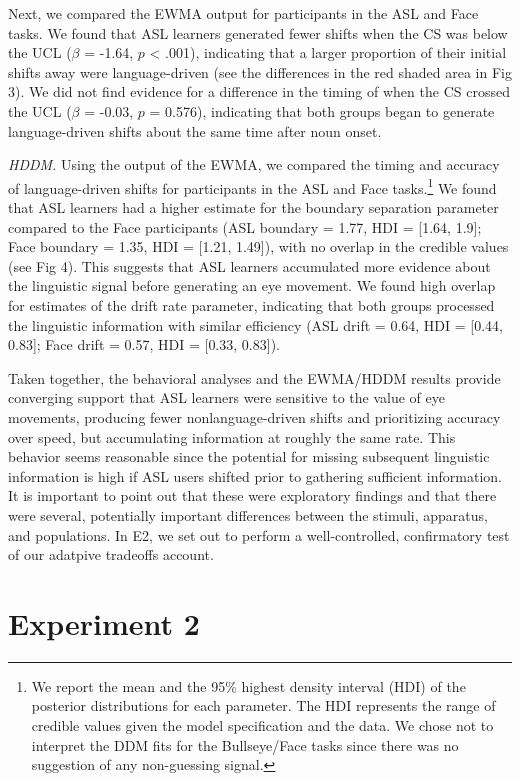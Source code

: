 \documentclass[10pt, letterpaper]{article}
\begin{document}
Next, we compared the EWMA output for participants in the ASL and Face
tasks. We found that ASL learners generated fewer shifts when the CS was
below the UCL (\(\beta\) = -1.64, \(p\) \textless{} .001), indicating
that a larger proportion of their initial shifts away were
language-driven (see the differences in the red shaded area in Fig 3).
We did not find evidence for a difference in the timing of when the CS
crossed the UCL (\(\beta\) = -0.03, \(p\) = 0.576), indicating that both
groups began to generate language-driven shifts about the same time
after noun onset.

\emph{HDDM.} Using the output of the EWMA, we compared the timing and
accuracy of language-driven shifts for participants in the ASL and Face
tasks.\footnote{We report the mean and the 95\% highest density interval
  (HDI) of the posterior distributions for each parameter. The HDI
  represents the range of credible values given the model specification
  and the data. We chose not to interpret the DDM fits for the
  Bullseye/Face tasks since there was no suggestion of any non-guessing
  signal.} We found that ASL learners had a higher estimate for the
boundary separation parameter compared to the Face participants (ASL
boundary = 1.77, HDI = {[}1.64, 1.9{]}; Face boundary = 1.35, HDI =
{[}1.21, 1.49{]}), with no overlap in the credible values (see Fig 4).
This suggests that ASL learners accumulated more evidence about the
linguistic signal before generating an eye movement. We found high
overlap for estimates of the drift rate parameter, indicating that both
groups processed the linguistic information with similar efficiency (ASL
drift = 0.64, HDI = {[}0.44, 0.83{]}; Face drift = 0.57, HDI = {[}0.33,
0.83{]}).

Taken together, the behavioral analyses and the EWMA/HDDM results
provide converging support that ASL learners were sensitive to the value
of eye movements, producing fewer nonlanguage-driven shifts and
prioritizing accuracy over speed, but accumulating information at
roughly the same rate. This behavior seems reasonable since the
potential for missing subsequent linguistic information is high if ASL
users shifted prior to gathering sufficient information. It is important
to point out that these were exploratory findings and that there were
several, potentially important differences between the stimuli,
apparatus, and populations. In E2, we set out to perform a
well-controlled, confirmatory test of our adatpive tradeoffs account.

\section{Experiment 2}\label{experiment-2}
\end{document}
